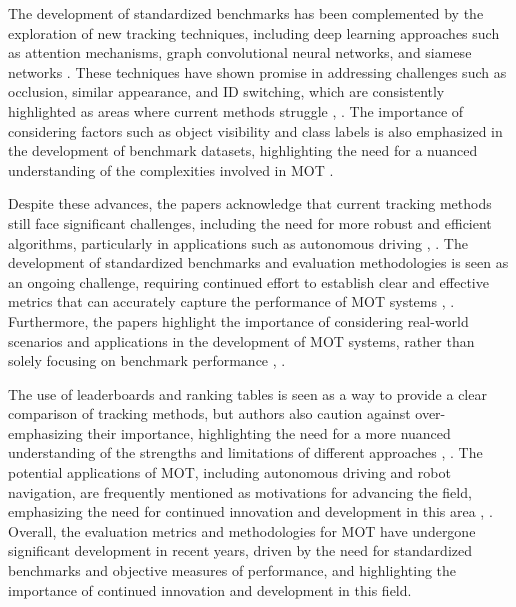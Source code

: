\documentclass[conference]{IEEEtran}
\begin{document}
The development of standardized benchmarks has been complemented by the exploration of new tracking techniques, including deep learning approaches such as attention mechanisms, graph convolutional neural networks, and siamese networks \cite{Recent Advances in Multiple Object Tracking: Techniques and Applications}. These techniques have shown promise in addressing challenges such as occlusion, similar appearance, and ID switching, which are consistently highlighted as areas where current methods struggle \cite{Multiple Object Tracking: A Review}, \cite{Recent Advances in Multiple Object Tracking: Techniques and Applications}. The importance of considering factors such as object visibility and class labels is also emphasized in the development of benchmark datasets, highlighting the need for a nuanced understanding of the complexities involved in MOT \cite{MOTChallenge: A Benchmark for Multi-Object Tracking}.

Despite these advances, the papers acknowledge that current tracking methods still face significant challenges, including the need for more robust and efficient algorithms, particularly in applications such as autonomous driving \cite{Multiple Object Tracking: A Review}, \cite{Recent Advances in Multiple Object Tracking: Techniques and Applications}. The development of standardized benchmarks and evaluation methodologies is seen as an ongoing challenge, requiring continued effort to establish clear and effective metrics that can accurately capture the performance of MOT systems \cite{MOTChallenge: A Benchmark for Multi-Object Tracking}, \cite{CVPR19 Tracking and Detection Challenge: How crowded can it get?}. Furthermore, the papers highlight the importance of considering real-world scenarios and applications in the development of MOT systems, rather than solely focusing on benchmark performance \cite{Multiple Object Tracking: A Review}, \cite{Recent Advances in Multiple Object Tracking: Techniques and Applications}.

The use of leaderboards and ranking tables is seen as a way to provide a clear comparison of tracking methods, but authors also caution against over-emphasizing their importance, highlighting the need for a more nuanced understanding of the strengths and limitations of different approaches \cite{MOTChallenge: A Benchmark for Multi-Object Tracking}, \cite{CVPR19 Tracking and Detection Challenge: How crowded can it get?}. The potential applications of MOT, including autonomous driving and robot navigation, are frequently mentioned as motivations for advancing the field, emphasizing the need for continued innovation and development in this area \cite{Multiple Object Tracking: A Review}, \cite{Recent Advances in Multiple Object Tracking: Techniques and Applications}. Overall, the evaluation metrics and methodologies for MOT have undergone significant development in recent years, driven by the need for standardized benchmarks and objective measures of performance, and highlighting the importance of continued innovation and development in this field.
\end{document}
